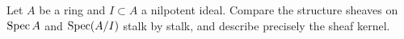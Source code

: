 \begin{problem}\label{chal:vi17-c03}
Let $A$ be a ring and $I\subset A$ a nilpotent ideal.  Compare the structure sheaves on $\operatorname{Spec} A$ and $\operatorname{Spec}(A/I)$ stalk by stalk, and describe precisely the sheaf kernel.
\end{problem}
